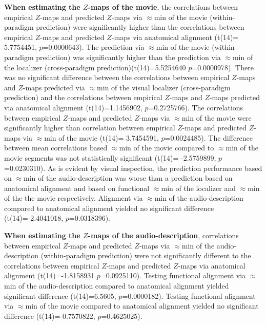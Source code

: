 %
\textbf{When estimating the $Z$-maps of the movie}, the correlations between
empirical $Z$-maps and predicted $Z$-maps via $\approx$\unit[15]{min} of the
movie (within-paradigm prediction) were significantly higher than the
correlations between empirical $Z$-maps and predicted $Z$-maps via anatomical
alignment (t(14)= 5.7754451, $p$=0.0000643).
%
The prediction via $\approx$\unit[15]{min} of the movie (within-paradigm
prediction) was significantly higher than the prediction via
$\approx$\unit[15]{min} of the localizer (cross-paradigm
prediction)(t(14)=5.5254640 $p$=0.0000978).
%
There was no significant difference between the correlations between empirical
$Z$-maps and $Z$-maps predicted via $\approx$\unit[15]{min} of the visual
localizer (cross-paradigm prediction) and the correlations between empirical
$Z$-maps and $Z$-maps predicted via anatomical alignment (t(14)=1.1456902,
$p$=0.2725766).
%
The correlations between empirical $Z$-maps and predicted $Z$-maps via
$\approx$\unit[30]{min} of the movie were significantly higher than correlation
between empirical $Z$-maps and predicted $Z$-maps via $\approx$\unit[15]{min} of
the movie (t(14)= 3.7454591, $p$=0.0024485).
%
The difference between mean correlations based $\approx$\unit[45]{min} of the
movie compared to $\approx$\unit[30]{min} of the movie segments was not
statistically significant (t(14)= -2.5759899, $p$=0.0230310).
%
As is evident by visual inspection, the prediction performance based on
$\approx$\unit[15]{min} of the audio-description was worse than a prediction
based on anatomical alignment and based on functional $\approx$\unit[15]{min} of
the localizer and $\approx$\unit[15]{min} of the the movie respectively.
%
Alignment via $\approx$\unit[120]{min} of the audio-description compared to
anatomical alignment yielded no significant difference (t(14)=-2.4041018,
$p$=0.0318396).

%
\textbf{When estimating the $Z$-maps of the audio-description}, correlations
between empirical $Z$-maps and predicted $Z$-maps via $\approx$\unit[15]{min} of
the audio-description (within-paradigm prediction) were not significantly
different to the correlations between empirical $Z$-maps and predicted $Z$-maps
via anatomical alignment (t(14)=-1.8158931 $p$=0.0925110).
%
Testing functional alignment via $\approx$\unit[120]{min} of the
audio-description compared to anatomical alignment yielded significant
difference (t(14)=6.5605, $p$=0.0000182).
%
Testing functional alignment via $\approx$\unit[120]{min} of the movie compared
to anatomical alignment yielded no significant difference (t(14)=-0.7570822,
$p$=0.4625025).





